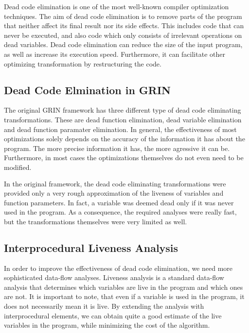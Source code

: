 \documentclass[main.tex]{subfiles}
\begin{document}
	
	Dead code elimination is one of the most well-known compiler optimization techniques. The aim of dead code elimination is to remove parts of the program that neither affect its final result nor its side effects. This includes code that can never be executed, and also code which only consists of irrelevant operations on dead variables. Dead code elimination can reduce the size of the input program, as well as increase its execution speed. Furthermore, it can facilitate other optimizing transformation by restructuring the code.
	
	\subsection{Dead Code Elmination in GRIN}
	
	The original GRIN framework has three different type of dead code eliminating transformations. These are dead function elimination, dead variable elimination and dead function paramater elimination. In general, the effectiveness of most optimizations solely depends on the accuracy of the information it has about the program. The more precise information it has, the more agressive it can be. Furthermore, in most cases the optimizations themselves do not even need to be modified.
	
	In the original framework, the dead code eliminating transformations were provided only a very rough approximation of the liveness of variables and function parameters. In fact, a variable was deemed dead only if it was never used in the program. As a consequence, the required analyses were really fast, but the transformations themselves were very limited as well.
	
	\subsection{Interprocedural Liveness Analysis}
	
	In order to improve the effectiveness of dead code elimination, we need more sophisticated data-flow analyses. Liveness analysis is a standard data-flow analysis that determines which variables are live in the program and which ones are not. It is important to note, that even if a variable is used in the program, it does not necessarily mean it is live. By extending the analysis with interprocedural elements, we can obtain quite a good estimate of the live variables in the program, while minimizing the cost of the algorithm.
	
	

	
\end{document}
